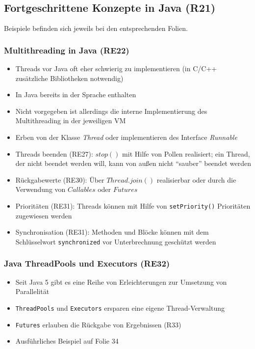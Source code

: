 \subsection{Fortgeschrittene Konzepte in Java (R21)}
Beispiele befinden sich jeweils bei den entsprechenden Folien.

\subsubsection{Multithreading in Java (RE22)}
\begin{itemize}
	\item Threads vor Java oft eher schwierig zu implementieren (in C/C++ zusätzliche Bibliotheken notwendig)
	\item In Java bereits in der Sprache enthalten
	\item Nicht vorgegeben ist allerdings die interne Implementierung des Multithreading in der jeweiligen VM
	\item Erben von der Klasse \textit{Thread} oder implementieren des Interface \textit{Runnable}
	\item Threads beenden (RE27): \(stop()\) mit Hilfe von Pollen realisiert; ein Thread, der nicht beendet werden will, kann von außen nicht "`sauber"' beendet werden
	\item Rückgabewerte (RE30): Über \(Thread.join()\) realisierbar oder durch die Verwendung von \(Callables\) oder \(Futures\)
	\item Prioritäten (RE31): Threads können mit Hilfe von \texttt{setPriority()} Prioritäten zugewiesen werden
	\item Synchronisation (RE31): Methoden und Blöcke können mit dem Schlüsselwort \texttt{synchronized} vor Unterbrechnung geschützt werden
\end{itemize}

\subsubsection{Java ThreadPools und Executors (RE32)}
\begin{itemize}
	\item Seit Java 5 gibt es eine Reihe von Erleichterungen zur Umsetzung von Parallelität
	\item \texttt{ThreadPools} und \texttt{Executors} ersparen eine eigene Thread-Verwaltung
	\item \texttt{Futures} erlauben die Rückgabe von Ergebnissen (R33)
	\item Ausführliches Beispiel auf Folie 34
\end{itemize}


